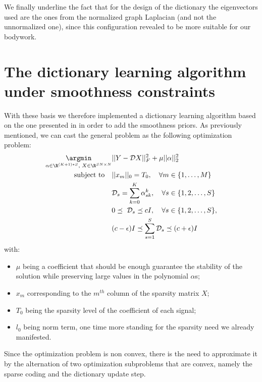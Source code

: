 We finally underline the fact that for the design of the dictionary the eigenvectors used are the ones from the normalized graph Laplacian (and not the unnormalized one), since this configuration revealed to be more suitable for our bodywork.

\section{The dictionary learning algorithm under smoothness constraints}
With these basis we therefore implemented a dictionary learning algorithm based on the one presented in \cite{Thanou2014} in order to add the smoothness priors. As previously mentioned, we can cast the general problem as the following optimization problem:
\begin{align}
  \underset{\small{\alpha \in \R^{(K+1)*S}, \text{ } X \in \R^{SN \times N}}}{\argmin} &||Y-\mathcal{D}X||^2_F + \mu ||\alpha||_2^2 \label{eq:objDictionary}\\
  \text{subject to} \quad &||x_m||_0 = T_0, \quad \forall m \in \{1,\dots,M\} \notag \\
  &\mathcal{D}_s = \sum_{k=0}^{K}\alpha_{sk}^k, \quad \forall s \in \{1,2,\dots,S\} \notag \\
  &0 \preceq \text{ } \mathcal{D}_s \preceq cI, \quad \forall s \in \{1,2,\dots , S\},\notag \\
  &(c-\epsilon)I \preceq \sum_{s=1}^{S}\mathcal{D}_s \preceq (c+\epsilon)I \notag
\end{align}
with:
\begin{itemize}
\item $\mu$ being a coefficient that should be enough guarantee the stability of the solution while preserving large values in the polynomial $\alpha$s;
\item $x_m$ corresponding to the $m^{th}$ column of the sparsity matrix $X$;
\item $T_0$ being the sparsity level of the coefficient of each signal;
\item $l_0$ being norm term, one time more standing for the sparsity need we already manifested.
\end{itemize}

Since the optimization problem is non convex, there is the need to approximate it by the alternation of two optimization subproblems that are convex, namely the sparse coding and the dictionary update step.\\

